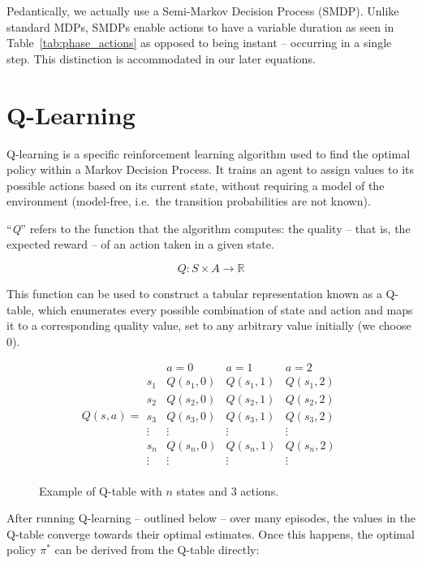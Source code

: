 \documentclass[a4paper]{report}
\begin{document}
Pedantically, we actually use a Semi-Markov Decision Process (SMDP). Unlike standard MDPs, SMDPs enable actions to have a variable duration as seen in Table~\ref{tab:phase_actions} as opposed to being instant -- occurring in a single step. This distinction is accommodated in our later equations.

\section{Q-Learning}

Q-learning is a specific reinforcement learning algorithm used to find the optimal policy within a Markov Decision Process. It trains an agent to assign values to its possible actions based on its current state, without requiring a model of the environment (model-free, i.e.\ the transition probabilities are not known).

``\emph{Q}'' refers to the function that the algorithm computes: the quality -- that is, the expected reward -- of an action taken in a given state.

\[
Q: S \times A \to \mathbb{R}
\]

This function can be used to construct a tabular representation known as a Q-table, which enumerates every possible combination of state and action and maps it to a corresponding quality value, set to any arbitrary value initially (we choose 0).

\begin{figure}[H]
  \centering
  \[
  Q(s, a) =
  \begin{array}{c|ccc}
    \text{} & a=0 & a=1 & a=2 \\
    \hline
    s_1 & Q(s_1,0) & Q(s_1,1) & Q(s_1,2) \\
    s_2 & Q(s_2,0) & Q(s_2,1) & Q(s_2,2) \\
    s_3 & Q(s_3,0) & Q(s_3,1) & Q(s_3,2) \\
    \vdots & \vdots & \vdots & \vdots \\
    s_n & Q(s_n,0) & Q(s_n,1) & Q(s_n,2) \\
    \vdots & \vdots & \vdots & \vdots \\
  
  \end{array}
  \]
  \caption{Example of Q-table with $n$ states and 3 actions.}
  \label{arr:q_table_example}
\end{figure}

After running Q-learning -- outlined below -- over many episodes, the values in the Q-table converge towards their optimal estimates. Once this happens, the optimal policy $\pi^*$ can be derived from the Q-table directly:
\end{document}
